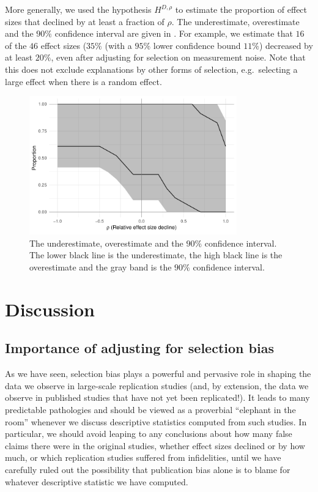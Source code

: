 \documentclass[11pt]{article}
\theoremstyle{definition}
\theoremstyle{custom}
\begin{document}
  More generally, we used the hypothesis $H^{D,\rho}$ to estimate the proportion of effect sizes that declined by at least a fraction of $\rho$. The underestimate, overestimate and the $90\%$ confidence interval are given in . For example, we estimate that $16$ of the $46$ effect sizes ($35\%$ (with a $95\%$ lower confidence bound $11\%$) decreased by at least $20\%$, even after adjusting for selection on measurement noise. Note that this does not exclude explanations by other forms of selection, e.g.\ selecting a large effect when there is a random effect.
  \begin{figure}[htbp]
    \centering
    \includegraphics[width=0.8\textwidth]{effect-decline-range}
    \caption{The underestimate, overestimate and the $90\%$ confidence interval. The lower black line is the underestimate, the high black line is the overestimate and the gray band is the $90\%$ confidence interval.}
  \label{fig:effect-decline-range}
  \end{figure}

\section{Discussion}
\label{sec:discussion}

\subsection{Importance of adjusting for selection bias}

  As we have seen, selection bias plays a powerful and pervasive role in shaping the data we observe in large-scale replication studies (and, by extension, the data we observe in published studies that have not yet been replicated!). It leads to many predictable pathologies and should be viewed as a proverbial ``elephant in the room'' whenever we discuss descriptive statistics computed from such studies. In particular, we should avoid leaping to any conclusions about how many false claims there were in the original studies, whether effect sizes declined or by how much, or which replication studies suffered from infidelities, until we have carefully ruled out the possibility that publication bias alone is to blame for whatever descriptive statistic we have computed.
\end{document}
